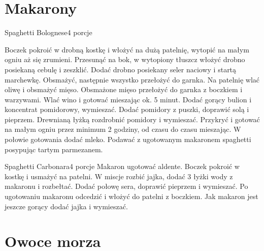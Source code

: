 \documentclass[a4paper,12pt]{article}
\begin{document}
\newpage

\section{Makarony}

\begin{recipe}{Spaghetti Bolognese}{4 porcje}{}

Boczek pokroić w drobną kostkę i włożyć na dużą patelnię, wytopić na małym ogniu aż się zrumieni.
Przesunąć na bok, w wytopiony tłuszcz włożyć drobno posiekaną cebulę i zeszklić.
Dodać drobno posiekany seler naciowy i startą marchewkę.
Obsmażyć, następnie wszystko przełożyć do garnka.
Na patelnię wlać oliwę i obsmażyć mięso.
Obsmażone mięso przełożyć do garnka z boczkiem i warzywami.
\freeform%
Wlać wino i gotować mieszając ok. 5 minut.
Dodać gorący bulion i koncentrat pomidorowy, wymieszać.
Dodać pomidory z puszki, doprawić solą i pieprzem. 
Drewnianą łyżką rozdrobnić pomidory i wymieszać.
Przykryć i gotować na małym ogniu przez minimum 2 godziny, od czasu do czasu mieszając.
W połowie gotowania dodać mleko. 
Podawać z ugotowanym makaronem spaghetti posypując tartym parmezanem.

\end{recipe}

\begin{recipe}{Spaghetti Carbonara}{4 porcje}{}
Makaron ugotować aldente. Boczek pokroić w kostkę i usmażyć na patelni. 
W miscje rozbić jajka, dodać 3 łyżki wody z makaronu i rozbełtać. 
Dodać połowę sera, doprawić pieprzem i wymieszać. 
Po ugotowaniu makaronu odcedzić i włożyć do patelni z boczkiem.
Jak makaron jest jeszcze gorący dodać jajka i wymieszać.


\end{recipe}


\section{Owoce morza}
\end{document}
